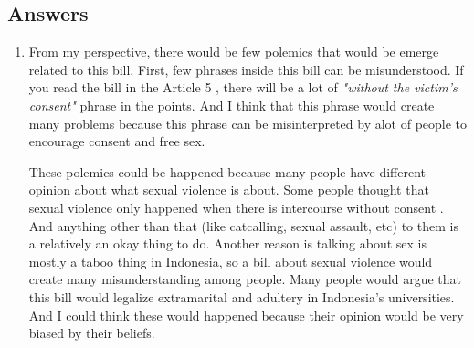 \documentclass[12pt]{article}
\begin{document}
    \subsection*{Answers}
    \begin{refsection}
        
        \begin{enumerate}
            \item 
            
            
            From my perspective, there would be few polemics that would be
            emerge related to this bill. First, few phrases inside this bill can
            be misunderstood. If you read the bill in the Article 5 \parencite{kementerianpendidikandankebudayaanPeraturanMenteri302021},
            there will be a lot of \emph{"without the victim's consent"} phrase in the
            points. And I think that this phrase would create many problems
            because this phrase can be misinterpreted by alot of people to
            encourage consent and free sex. 
            
            These polemics could be happened because many people have different
            opinion about what sexual violence is about. Some people thought
            that sexual violence only happened when there is intercourse without
            consent \parencite{chandraNadiemMakarimSexual2021}. And anything other than that (like catcalling, sexual
            assault, etc) to them is a relatively an okay thing to do. Another reason
            is talking about sex is mostly a taboo thing in Indonesia, so a bill
            about sexual violence would create many misunderstanding among people.
            Many people would argue that this bill would legalize extramarital
            and adultery in Indonesia's universities. And I could think these
            would happened because their opinion would be very biased by
            their beliefs.
            

\end{enumerate}
\end{refsection}
\end{document}
